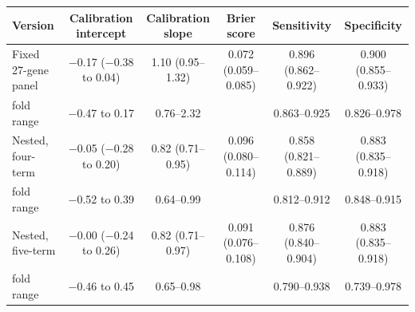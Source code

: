 \begin{tabular}{lccccc}
\toprule
Version & Calibration intercept & Calibration slope & Brier score & Sensitivity & Specificity \\
\midrule
Fixed 27-gene panel & $-$0.17 ($-$0.38 to 0.04) & 1.10 (0.95--1.32) & 0.072 (0.059--0.085) & 0.896 (0.862--0.922) & 0.900 (0.855--0.933) \\
\quad fold range & $-$0.47 to 0.17 & 0.76--2.32 & & 0.863--0.925 & 0.826--0.978 \\
Nested, four-term & $-$0.05 ($-$0.28 to 0.20) & 0.82 (0.71--0.95) & 0.096 (0.080--0.114) & 0.858 (0.821--0.889) & 0.883 (0.835--0.918) \\
\quad fold range & $-$0.52 to 0.39 & 0.64--0.99 & & 0.812--0.912 & 0.848--0.915 \\
Nested, five-term & $-$0.00 ($-$0.24 to 0.26) & 0.82 (0.71--0.97) & 0.091 (0.076--0.108) & 0.876 (0.840--0.904) & 0.883 (0.835--0.918) \\
\quad fold range & $-$0.46 to 0.45 & 0.65--0.98 & & 0.790--0.938 & 0.739--0.978 \\
\bottomrule
\end{tabular}
